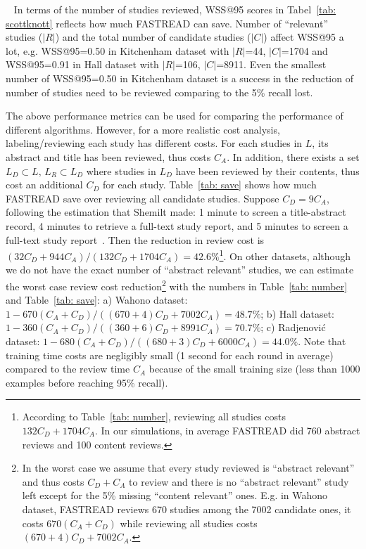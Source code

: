\documentclass{svjour3}
\theoremstyle{break}
\newcommand{\respto}[1]{
\fcolorbox{black}{black!15}{
\label{response:#1}
\bf
  \scriptsize R-{#1}}~
}
\begin{document}
\respto{1j}In terms of the number of studies reviewed, WSS@95 scores in Tabel~\ref{tab: scottknott} reflects how much FASTREAD can save. Number of ``relevant'' studies ($|R|$) and the total number of candidate studies ($|C|$) affect WSS@95 a lot, e.g. WSS@95=0.50 in Kitchenham dataset with $|R|$=44, $|C|$=1704 and WSS@95=0.91 in Hall dataset with $|R|$=106, $|C|$=8911. Even the smallest number of WSS@95=0.50 in Kitchenham dataset is a success in the reduction of number of studies need to be reviewed comparing to the 5\% recall lost.

The above performance metrics can be used for comparing the performance of different algorithms. However, for a more realistic cost analysis, labeling/reviewing each study has different costs. For each studies in $L$, its abstract and title has been reviewed, thus costs $C_A$. In addition, there exists a set $L_D\subset L,\,L_R\subset L_D$ where studies in $L_D$ have been reviewed by their contents, thus cost an additional $C_D$ for each study.  Table~\ref{tab: save} shows how much FASTREAD save over reviewing all candidate studies. Suppose $C_D=9C_A$, following the estimation that Shemilt made: 1 minute to screen a title-abstract record, 4 minutes to retrieve a full-text study report, and 5 minutes to screen a full-text study report~\cite{shemilt2016use}. Then the reduction in review cost is $(32C_D+944C_A)/(132C_D+1704C_A) = 42.6\%$\footnote{According to Table~\ref{tab: number}, reviewing all studies costs $132C_D+1704C_A$. In our simulations, in average FASTREAD did 760 abstract reviews and 100 content reviews.}. On other datasets, although we do not have the exact number of ``abstract relevant'' studies, we can estimate the worst case review cost reduction\footnote{In the worst case we assume that every study reviewed is ``abstract relevant'' and thus costs $C_D+C_A$ to review and there is no ``abstract relevant'' study left except for the 5\% missing ``content relevant'' ones. E.g. in Wahono dataset, FASTREAD reviews 670 studies among the 7002 candidate ones, it costs $670(C_A+C_D)$ while reviewing all studies costs $(670+4)C_D+7002C_A$.} with the numbers in Table~\ref{tab: number} and Table~\ref{tab: save}: a) Wahono dataset: $1-670(C_A+C_D)/((670+4)C_D+7002C_A) = 48.7\%$; b) Hall dataset: $1-360(C_A+C_D)/((360+6)C_D+8991C_A) = 70.7\%$; c) Radjenovi{\'c} dataset: $1-680(C_A+C_D)/((680+3)C_D+6000C_A) = 44.0\%$. 
Note that training time costs are negligibly small (1 second for each round in average) compared to the review time $C_A$ because of the small training size (less than 1000 examples before reaching 95\% recall). 
\end{document}
